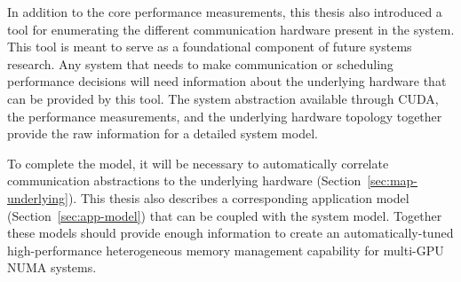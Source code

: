 In addition to the core performance measurements, this thesis also introduced a tool for enumerating the different communication hardware present in the system.
This tool is meant to serve as a foundational component of future systems research.
Any system that needs to make communication or scheduling performance decisions will need information about the underlying hardware that can be provided by this tool.
The system abstraction available through CUDA, the performance measurements, and the underlying hardware topology together provide the raw information for a detailed system model.

To complete the model, it will be necessary to automatically correlate communication abstractions to the underlying hardware (Section~\ref{sec:map-underlying}).
This thesis also describes a corresponding application model (Section~\ref{sec:app-model}) that can be coupled with the system model.
Together these models should provide enough information to create an automatically-tuned high-performance heterogeneous memory management capability for multi-GPU NUMA systems.
